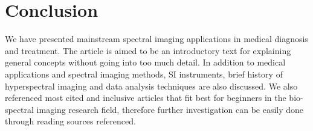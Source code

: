 \documentclass[a4paper]{article}
\begin{document}
    \section{Conclusion} %
    \label{sec:conclusion}
    
    \hspace{5mm} We have presented mainstream spectral imaging applications in medical diagnosis and treatment. The article is aimed to be an introductory text for explaining general concepts without going into too much detail. In addition to medical applications and spectral imaging methods, SI instruments, brief history of hyperspectral imaging and data analysis techniques are also discussed. We also referenced most cited and inclusive articles that fit best for beginners in the bio-spectral imaging research field, therefore further investigation can be easily done through reading sources referenced. 
    
    \medskip
    \hspace{5mm}








 
   

\end{document}
